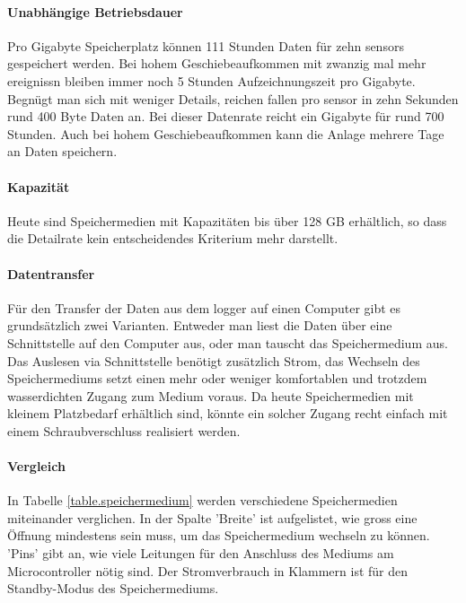 \paragraph{Unabhängige Betriebsdauer} Pro Gigabyte Speicherplatz können 111 Stunden Daten für zehn \glspl{sensor} gespeichert werden. Bei hohem Geschiebeaufkommen mit zwanzig mal mehr \glspl{ereignis}n bleiben immer noch 5 Stunden Aufzeichnungszeit pro Gigabyte. Begnügt man sich mit weniger Details, reichen fallen pro \gls{sensor} in zehn Sekunden rund 400 Byte Daten an. Bei dieser Datenrate reicht ein Gigabyte für rund 700 Stunden. Auch bei hohem Geschiebeaufkommen kann die Anlage mehrere Tage an Daten speichern. 

\paragraph{Kapazität} Heute sind Speichermedien mit Kapazitäten bis über 128 GB erhältlich, so dass die Detailrate kein entscheidendes Kriterium mehr darstellt.

\paragraph{Datentransfer} Für den Transfer der Daten aus dem \gls{logger} auf einen Computer gibt es grundsätzlich zwei Varianten. Entweder man liest die Daten über eine Schnittstelle auf den Computer aus, oder man tauscht das Speichermedium aus. Das Auslesen via Schnittstelle benötigt zusätzlich Strom, das Wechseln des Speichermediums setzt einen mehr oder weniger komfortablen und trotzdem wasserdichten Zugang zum Medium voraus. Da heute Speichermedien mit kleinem Platzbedarf erhältlich sind, könnte ein solcher Zugang recht einfach mit einem Schraubverschluss realisiert werden.

\paragraph{Vergleich} In Tabelle \ref{table.speichermedium} werden verschiedene Speichermedien miteinander verglichen. In der Spalte 'Breite' ist aufgelistet, wie gross eine Öffnung mindestens sein muss, um das Speichermedium wechseln zu können. 'Pins' gibt an, wie viele Leitungen für den Anschluss des Mediums am Microcontroller nötig sind. Der Stromverbrauch in Klammern ist für den Standby-Modus des Speichermediums.

